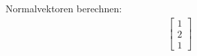 \documentclass[preview]{standalone}
\begin{document}
\begin{center}
Normalvektoren berechnen: \begin{align} \begin{bmatrix} 1 \\ 2 \\ 1 \end{bmatrix} \end{align}
\end{center}
\end{document}
